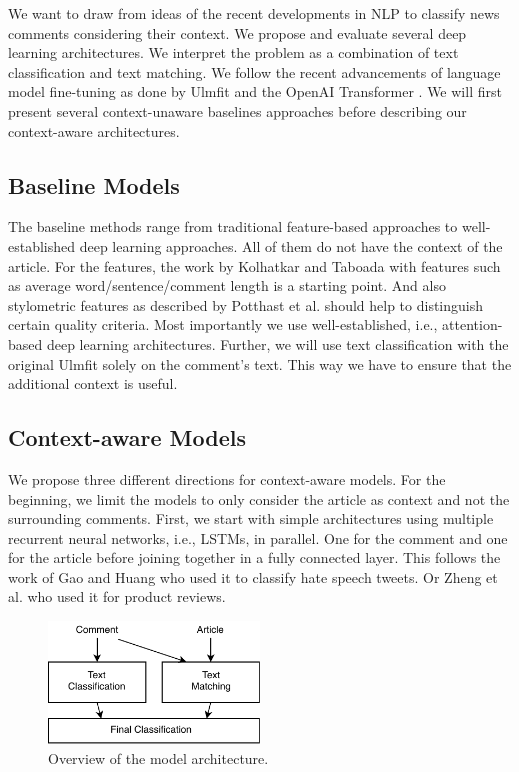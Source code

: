 We want to draw from ideas of the recent developments in NLP to classify news comments considering their context. We propose and evaluate several deep learning architectures. We interpret the problem as a combination of text classification and text matching. We follow the recent advancements of language model fine-tuning as done by Ulmfit \cite{howard_universal_2018} and the OpenAI Transformer \cite{radford2018improving}. We will first present several context-unaware baselines approaches before describing our context-aware architectures.

\subsection{Baseline Models}

The baseline methods range from traditional feature-based approaches to well-established deep learning approaches.
All of them do not have the context of the article. For the features, the work by Kolhatkar and Taboada \cite{kolhatkar_using_2017} with features such as average word/sentence/comment length is a starting point. And also stylometric features as described by Potthast et al. \cite{2017arXiv170205638P} should help to distinguish certain quality criteria. Most importantly we use well-established, i.e., attention-based deep learning architectures. Further, we will use text classification with the original Ulmfit \cite{howard_universal_2018} solely on the comment's text. This way we have to ensure that the additional context is useful.
\subsection{Context-aware Models}

We propose three different directions for context-aware models. For the beginning, we limit the models to only consider the article as context and not the surrounding comments.
First, we start with simple architectures using multiple recurrent neural networks, i.e., LSTMs, in parallel. One for the comment and one for the article before joining together in a fully connected layer. This follows the work of Gao and Huang \cite{Gao_2017} who used it to classify hate speech tweets. Or Zheng et al. \cite{Zheng:2017:JDM:3018661.3018665} who used it for product reviews.

 \begin{figure}
 \includegraphics[width=0.5\textwidth]{ma}
   \caption{Overview of the model architecture.}
    \label{fig:model}
\end{figure}

